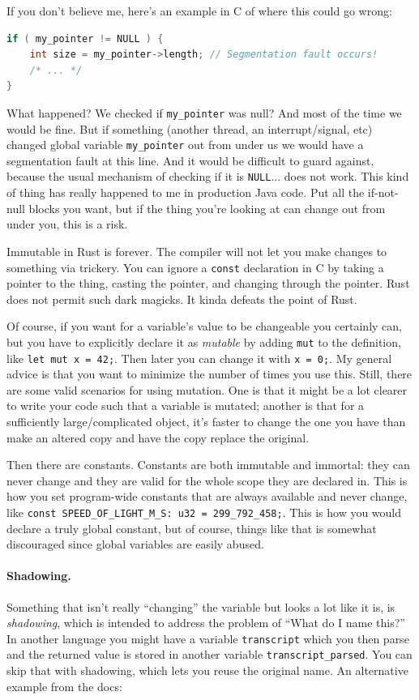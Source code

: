 If you don't believe me, here's an example in C of where this could go wrong:
\begin{lstlisting}[language=C]
if ( my_pointer != NULL ) {
    int size = my_pointer->length; // Segmentation fault occurs!
    /* ... */
}
\end{lstlisting}

What happened? We checked if \texttt{my\_pointer} was null? And most of the time we would be fine. But if something (another thread, an interrupt/signal, etc) changed global variable \texttt{my\_pointer} out from under us we would have a segmentation fault at this line. And it would be difficult to guard against, because the usual mechanism of checking if it is \texttt{NULL}... does not work. This kind of thing has really happened to me in production Java code. Put all the if-not-null blocks you want, but if the thing you're looking at can change out from under you, this is a risk.

Immutable in Rust is forever. The compiler will not let you make changes to something via trickery. You can ignore a \texttt{const} declaration in C by taking a pointer to the thing, casting the pointer, and changing through the pointer. Rust does not permit such dark magicks. It kinda defeats the point of Rust.

Of course, if you want for a variable's value to be changeable you certainly can, but you have to explicitly declare it as \textit{mutable} by adding \texttt{mut} to the definition, like \texttt{let mut x = 42;}. Then later you can change it with \texttt{x = 0;}. My general advice is that you want to minimize the number of times you use this. Still, there are some valid scenarios for using mutation. One is that it might be a lot clearer to write your code such that a variable is mutated; another is that for a sufficiently large/complicated object, it's faster to change the one you have than make an altered copy and have the copy replace the original.

Then there are constants. Constants are both immutable and immortal: they can never change and they are valid for the whole scope they are declared in. This is how you set program-wide constants that are always available and never change, like \texttt{const SPEED\_OF\_LIGHT\_M\_S: u32 = 299\_792\_458;}. This is how you would declare a truly global constant, but of course, things like that is somewhat discouraged since global variables are easily abused.

\paragraph{Shadowing.}
Something that isn't really ``changing'' the variable but looks a lot like it is, is \textit{shadowing}, which is intended to address the problem of ``What do I name this?'' In another language you might have a variable \texttt{transcript} which you then parse and the returned value is stored in another variable \texttt{transcript\_parsed}. You can skip that with shadowing, which lets you reuse the original name. An alternative example from the docs:

